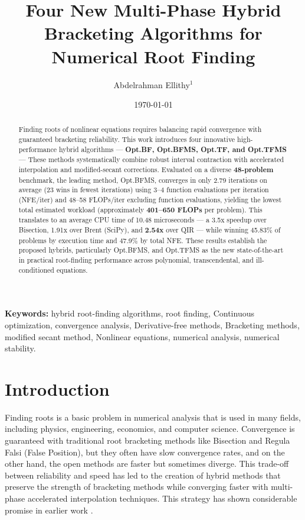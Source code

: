 \documentclass[amsmath, amssymb, aps]{revtex4-2}
\begin{document}
\pagestyle{plain}

\title{Four New Multi-Phase Hybrid Bracketing Algorithms for Numerical Root Finding }

\author{Abdelrahman Ellithy$^{1}$}

\date{\today}


\begin{abstract}
Finding roots of nonlinear equations requires balancing rapid convergence with guaranteed bracketing reliability. This work introduces four innovative high-performance hybrid algorithms — \textbf{Opt.BF, Opt.BFMS, Opt.TF, and Opt.TFMS} — These methods systematically combine robust interval contraction with accelerated interpolation and modified-secant corrections. Evaluated on a diverse \textbf{48-problem} benchmark, the leading method, Opt.BFMS, converges in only 2.79 iterations on average (23 wins in fewest iterations) using 3–4 function evaluations per iteration (NFE/iter) and 48–58 FLOPs/iter excluding function evaluations, yielding the lowest total estimated workload (approximately \textbf{401–650 FLOPs} per problem). This translates to an average CPU time of 10.48 microseconds — a 3.5x speedup over Bisection, 1.91x over Brent (SciPy), and \textbf{2.54x} over QIR — while winning 45.83\% of problems by execution time and 47.9\% by total NFE. These results establish the proposed hybrids, particularly Opt.BFMS, and Opt.TFMS as the new state-of-the-art in practical root-finding performance across polynomial, transcendental, and ill-conditioned equations.
\end{abstract}

\maketitle

\noindent\textbf{Keywords:} hybrid root-finding algorithms, root finding, Continuous optimization, convergence analysis, Derivative-free methods, Bracketing methods, modified secant method, Nonlinear equations, numerical analysis, numerical stability.

\section{Introduction}

Finding roots is a basic problem in numerical analysis that is used in many fields, including physics, engineering, economics, and computer science. Convergence is guaranteed with traditional root bracketing methods like Bisection and Regula Falsi (False Position), but they often have slow convergence rates, and on the other hand, the open methods are faster but sometimes diverge. This trade-off between reliability and speed has led to the creation of hybrid methods that preserve the strength of bracketing methods while converging faster with multi-phase accelerated interpolation techniques. This strategy has shown considerable promise in earlier work \cite{sabharwal2019blended, badr2021comparative}. 
\end{document}
